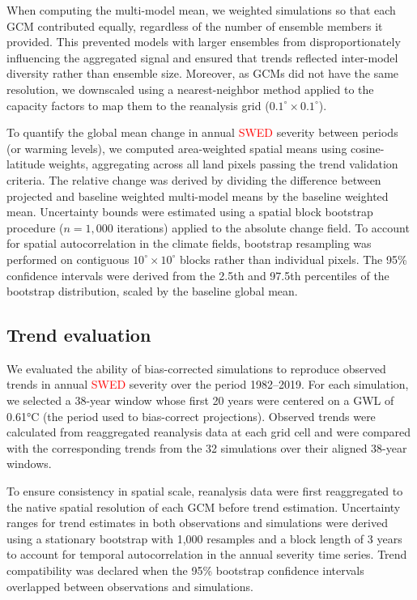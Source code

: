 \documentclass[pdflatex,sn-mathphys-num]{sn-jnl}%
\begin{document}
When computing the multi-model mean, we weighted simulations so that each GCM contributed equally, regardless of the number of ensemble members it provided. This prevented models with larger ensembles from disproportionately influencing the aggregated signal and ensured that trends reflected inter-model diversity rather than ensemble size. Moreover, as GCMs did not have the same resolution, we downscaled using a nearest-neighbor method applied to the capacity factors to map them to the reanalysis grid ($0.1^{\circ}\times 0.1^{\circ}$).

To quantify the global mean change in annual \textcolor{red}{SWED} severity between periods (or warming levels), we computed area-weighted spatial means using cosine-latitude weights, aggregating across all land pixels passing the trend validation criteria. The relative change was derived by dividing the difference between projected and baseline weighted multi-model means by the baseline weighted mean. Uncertainty bounds were estimated using a spatial block bootstrap procedure ($n = 1{,}000$ iterations) applied to the absolute change field. To account for spatial autocorrelation in the climate fields, bootstrap resampling was performed on contiguous $10^{\circ} \times 10^{\circ}$ blocks rather than individual pixels. The 95\% confidence intervals were derived from the 2.5th and 97.5th percentiles of the bootstrap distribution, scaled by the baseline global mean.


\subsection{Trend evaluation}\label{meth:trend}

We evaluated the ability of bias-corrected simulations to reproduce observed trends in annual \textcolor{red}{SWED} severity over the period 1982–2019. For each simulation, we selected a 38-year window whose first 20 years were centered on a GWL of 0.61°C (the period used to bias-correct projections). Observed trends were calculated from reaggregated reanalysis data at each grid cell and were compared with the corresponding trends from the 32 simulations over their aligned 38-year windows.

To ensure consistency in spatial scale, reanalysis data were first reaggregated to the native spatial resolution of each GCM before trend estimation. Uncertainty ranges for trend estimates in both observations and simulations were derived using a stationary bootstrap with 1,000 resamples and a block length of 3 years \citep{Wilks2006, politisStationaryBootstrap1994} to account for temporal autocorrelation in the annual severity time series. Trend compatibility was declared when the 95\% bootstrap confidence intervals overlapped between observations and simulations.
\end{document}
